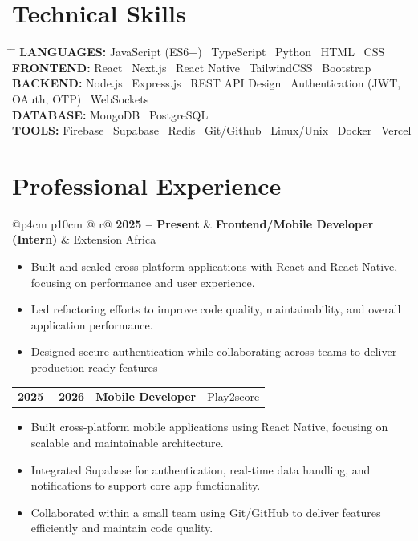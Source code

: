 \documentclass{article}
\makeatletter
\newcommand{\cventry}[3]{%
    \noindent
    \begin{tabular*}{\linewidth}{@{}p{4cm} p{10cm} @{\extracolsep{\fill}} r@{}}
        \textbf{\small #1} & \textbf{#2} & {\color{primarycolor}\small #3}
    \end{tabular*}
    \vspace{-3pt}
}
\makeatother
\begin{document}
\section{Technical Skills}
\vspace{-0.3cm}
\begin{tabbing}
\hspace{4cm} \= \hspace{7.5cm} \= \kill
\textbf{\uppercase{Languages:}} \> JavaScript (ES6+) \textbar\ TypeScript \textbar\ Python \textbar\ HTML \textbar\ CSS   \\

\textbf{\uppercase{Frontend:}} \> React \textbar\ Next.js \textbar\ React Native \textbar\ TailwindCSS \textbar\ Bootstrap \\

\textbf{\uppercase{Backend:}} \> Node.js \textbar\ Express.js \textbar\ REST API Design \textbar\ Authentication (JWT, OAuth, OTP) \textbar\ WebSockets \\


\textbf{\uppercase{Database:}} \> MongoDB \textbar\ PostgreSQL \\

\textbf{\uppercase{Tools:}} \> Firebase \textbar\ Supabase \textbar\ Redis \textbar\ Git/Github \textbar\ Linux/Unix \textbar\ Docker \textbar\ Vercel 

\end{tabbing}

\section{Professional Experience}
\vspace{-0.3cm}
\cventry{2025 -- Present}{Frontend/Mobile Developer (Intern)}{Extension Africa}
\vspace{-0.4cm}
\begin{itemize}
    \item Built and scaled cross-platform applications with React and React Native, focusing on performance and user experience.
    \item Led refactoring efforts to improve code quality, maintainability, and overall application performance.
    \item Designed secure authentication while collaborating across teams to deliver production-ready features
\end{itemize}

\cventry{2025 -- 2026}{Mobile Developer}{Play2score}
\vspace{-0.4cm}
\begin{itemize}
    \item Built cross-platform mobile applications using React Native, focusing on scalable and maintainable architecture.
    \item Integrated Supabase for authentication, real-time data handling, and notifications to support core app functionality.
    \item Collaborated within a small team using Git/GitHub to deliver features efficiently and maintain code quality.
\end{itemize}
\end{document}
